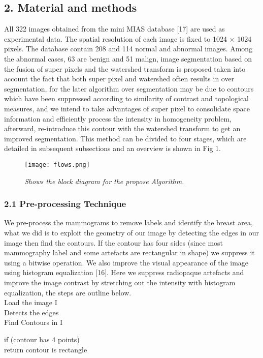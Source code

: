 \documentclass{article}
\begin{document}
\subsection*{2. Material and methods}
All 322 images obtained from the mini MIAS database [17] are used as experimental data. The spatial resolution of each image is fixed to 1024 $\times$ 1024 pixels. The database contain 208 and 114 normal and abnormal images. Among the abnormal cases, 63 are benign and 51 malign, image segmentation based on the fusion of super pixels and the watershed transform is proposed taken into account the fact that both super pixel and watershed often results in over segmentation, for the later algorithm over segmentation may be due to contours which have been suppressed according to similarity of contrast and topological measures, and we intend to take advantages of super pixel to consolidate space information and efficiently process the intensity in homogeneity problem, afterward, re-introduce this contour with the watershed transform to get an improved segmentation. This method can be divided to four stages, which are detailed in subsequent subsections and an overview is shown in Fig 1.


\begin{figure}
	\centering
	\texttt{[image: flows.png]}
	\caption{\textit{Shows the block diagram for the propose Algorithm.}}
\end{figure}
\newpage
\subsubsection*{2.1 Pre-processing Technique}We pre-process the mammograms to remove labels and identify the breast area, what we did is to exploit the geometry of our image by detecting the edges in our image then find the contours. If the contour has four  sides (since most mammography label and some artefacts are rectangular in shape) we suppress it using a bitwise operation. We  also improve the visual appearance of the image using histogram equalization [16].
Here we suppress radiopaque artefacts and improve the image contrast by stretching out the intensity with histogram equalization, the steps are outline below.\\ 

Load the image I\\ 
Detects the edges\\
Find Contours in I

\hspace{1ex} if (contour has 4 points)\\
\hspace*{6ex} return contour is rectangle
\end{document}
